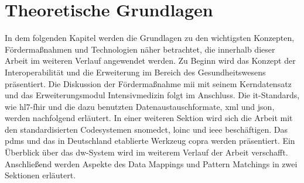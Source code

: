 \chapter{Theoretische Grundlagen} \label{ch:theobasis}

In dem folgenden Kapitel werden die Grundlagen zu den wichtigsten Konzepten, Fördermaßnahmen und Technologien näher betrachtet, die innerhalb dieser Arbeit im weiteren Verlauf angewendet werden. Zu Beginn wird das Konzept der Interoperabilität und die Erweiterung im Bereich des Gesundheitswesens präsentiert. Die Diskussion der Fördermaßnahme \glqq \ac{mii}\grqq{} mit seinem Kerndatensatz und das Erweiterungsmodul Intensivmedizin folgt im Anschluss. Die \ac{it}-Standards, wie \ac{hl7}-\ac{fhir} und die dazu benutzten Datenaustauschformate, \ac{xml} und \ac{json}, werden nachfolgend erläutert. In einer weiteren Sektion wird sich die Arbeit mit den standardisierten Codesystemen \ac{snomedct}, \ac{loinc} und \ac{ieee} beschäftigen. Das \ac{pdms} und das in Deutschland etablierte Werkzeug \ac{copra} werden präsentiert. Ein Überblick über das \ac{dw}-System wird im weiterem Verlauf der Arbeit verschafft. Anschließend werden Aspekte des Data Mappings und Pattern Matchings in zwei Sektionen erläutert.
